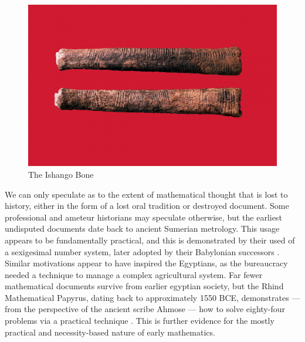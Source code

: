 \documentclass[12pt]{article}
\begin{document}
\begin{figure}
	\includegraphics[scale=0.3]{ishango.png}
	\centering
	\caption{The Ishango Bone \cite{ishango}}
	\label{fig1}
\end{figure}

We can only speculate
as to the extent of mathematical thought
that is lost to history,
either in the form of a lost oral tradition
or destroyed document.
Some professional and ameteur historians
may speculate otherwise,
but the earliest undisputed documents
date back to ancient Sumerian metrology.
This usage appears to be fundamentally practical,
and this is demonstrated by their used of
a sexigesimal number system,
later adopted by their Babylonian successors \cite{boyer1991}.
Similar motivations appear to have inspired the Egyptians,
as the bureaucracy needed a technique
to manage a complex agricultural system.
Far fewer mathematical documents survive
from earlier egyptian society,
but the Rhind Mathematical Papyrus,
dating back to approximately 1550 BCE,
demonstrates --- from the perspective of
the ancient scribe Ahmose ---
how to solve eighty-four problems
via a practical technique \cite{rhind}.
This is further evidence for the mostly
practical and necessity-based nature
of early mathematics.



\end{document}
